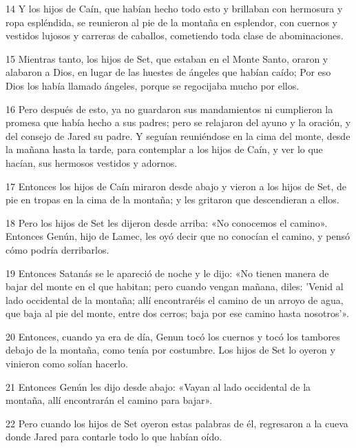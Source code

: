\par 14 Y los hijos de Caín, que habían hecho todo esto y brillaban con hermosura y ropa espléndida, se reunieron al pie de la montaña en esplendor, con cuernos y vestidos lujosos y carreras de caballos, cometiendo toda clase de abominaciones.

\par 15 Mientras tanto, los hijos de Set, que estaban en el Monte Santo, oraron y alabaron a Dios, en lugar de las huestes de ángeles que habían caído; Por eso Dios los había llamado ángeles, porque se regocijaba mucho por ellos.

\par 16 Pero después de esto, ya no guardaron sus mandamientos ni cumplieron la promesa que había hecho a sus padres; pero se relajaron del ayuno y la oración, y del consejo de Jared su padre. Y seguían reuniéndose en la cima del monte, desde la mañana hasta la tarde, para contemplar a los hijos de Caín, y ver lo que hacían, sus hermosos vestidos y adornos.

\par 17 Entonces los hijos de Caín miraron desde abajo y vieron a los hijos de Set, de pie en tropas en la cima de la montaña; y les gritaron que descendieran a ellos.

\par 18 Pero los hijos de Set les dijeron desde arriba: «No conocemos el camino». Entonces Genún, hijo de Lamec, les oyó decir que no conocían el camino, y pensó cómo podría derribarlos.

\par 19 Entonces Satanás se le apareció de noche y le dijo: «No tienen manera de bajar del monte en el que habitan; pero cuando vengan mañana, diles: 'Venid al lado occidental de la montaña; allí encontraréis el camino de un arroyo de agua, que baja al pie del monte, entre dos cerros; baja por ese camino hasta nosotros'».

\par 20 Entonces, cuando ya era de día, Genun tocó los cuernos y tocó los tambores debajo de la montaña, como tenía por costumbre. Los hijos de Set lo oyeron y vinieron como solían hacerlo.

\par 21 Entonces Genún les dijo desde abajo: «Vayan al lado occidental de la montaña, allí encontrarán el camino para bajar».

\par 22 Pero cuando los hijos de Set oyeron estas palabras de él, regresaron a la cueva donde Jared para contarle todo lo que habían oído.

